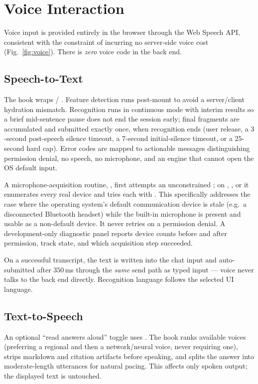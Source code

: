 \section{Voice Interaction}
\label{sec:voice}


Voice input is provided entirely in the browser through the Web Speech API,
consistent with the constraint of incurring no server-side voice cost
(Fig.~\ref{fig:voice}). There is \emph{zero} voice code in the back end.

\subsection{Speech-to-Text}
The  hook wraps  /
. Feature detection runs post-mount to avoid a
server/client hydration mismatch. Recognition runs in continuous mode with
interim results so a brief mid-sentence pause does not end the session
early; final fragments are accumulated and submitted exactly once, when
recognition ends (user release, a $3$-second post-speech silence timeout, a
$7$-second initial-silence timeout, or a $25$-second hard cap). Error codes
are mapped to actionable messages distinguishing permission denial, no
speech, no microphone, and an engine that cannot open the OS default input.

A microphone-acquisition routine, , first attempts
an unconstrained ; on
, , or 
it enumerates every real  device and tries each with
. This specifically addresses the case where the
operating system's default communication device is stale (e.g.\ a
disconnected Bluetooth headset) while the built-in microphone is present
and usable as a non-default device. It never retries on a permission
denial. A development-only diagnostic panel reports device counts before
and after permission, track state, and which acquisition step succeeded.

On a successful transcript, the text is written into the chat input and
auto-submitted after $350$\,ms through the \emph{same} send path as typed
input --- voice never talks to the back end directly. Recognition language
follows the selected UI language.

\subsection{Text-to-Speech}
An optional ``read answers aloud'' toggle uses . The
hook ranks available voices (preferring a regional and then a
network/neural voice, never requiring one), strips markdown and citation
artifacts before speaking, and splits the answer into moderate-length
utterances for natural pacing. This affects only spoken output; the
displayed text is untouched.

